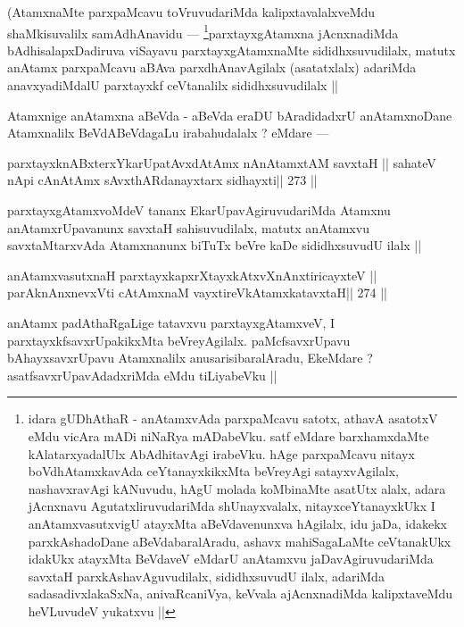 \begin{artha}
(AtamxnaMte parxpaMcavu toVruvudariMda kalipxtavalalxveMdu shaMkisuvalilx samAdhAnavidu --- \footnote[3]{idara gUDhAthaR - anAtamxvAda parxpaMcavu satotx, athavA asatotxV eMdu vicAra mADi niNaRya mADabeVku. satf eMdare barxhamxdaMte kAlatarxyadalUlx AbAdhitavAgi irabeVku. hAge parxpaMcavu nitayx boVdhAtamxkavAda ceYtanayxkikxMta beVreyAgi satayxvAgilalx, nashavxravAgi kANuvudu, hAgU molada koMbinaMte asatUtx alalx, adara jAcnxnavu AgutatxliruvudariMda shUnayxvalalx, nitayxceYtanayxkUkx I anAtamxvasutxvigU atayxMta aBeVdavenunxva hAgilalx, idu jaDa, idakekx parxkAshadoDane aBeVdabaralAradu, ashavx mahiSagaLaMte ceVtanakUkx idakUkx atayxMta BeVdaveV eMdarU anAtamxvu jaDavAgiruvudariMda savxtaH parxkAshavAguvudilalx, sididhxsuvudU ilalx, adariMda sadasadivxlakaSxNa, anivaRcaniVya, keVvala ajAcnxnadiMda kalipxtaveMdu heVLuvudeV yukatxvu ||}parxtayxgAtamxna jAcnxnadiMda bAdhisalapxDadiruva viSayavu parxtayxgAtamxnaMte sididhxsuvudilalx, matutx anAtamx parxpaMcavu aBAva parxdhAnavAgilalx (asatatxlalx) adariMda anavxyadiMdalU parxtayxkf ceVtanalilx sididhxsuvudilalx ||
\end{artha}

\begin{artha}
Atamxnige anAtamxna aBeVda - aBeVda eraDU bAradidadxrU anAtamxnoDane Atamxnalilx BeVdABeVdagaLu irabahudalalx ? eMdare ---
\end{artha}

\begin{shl}
parxtayxknABxterxYkarUpatAvxdAtAmx nAnAtamxtAM savxtaH ||
sahateV nApi cAnAtAmx sAvxthARdanayxtarx sidhayxti\hfill || 273 ||
\end{shl}

\begin{artha}
parxtayxgAtamxvoMdeV tananx EkarUpavAgiruvudariMda Atamxnu anAtamxrUpavanunx savxtaH sahisuvudilalx, matutx anAtamxvu savxtaMtarxvAda Atamxnanunx biTuTx beVre kaDe sididhxsuvudU ilalx ||
\end{artha}

\begin{shl}
anAtamxvasutxnaH parxtayxkapxrXtayxkAtxvXnAnxtiricayxteV ||
parAknAnxnevxVti cA\s\s tAmxnaM vayxtireVkAtamxkatavxtaH\hfill || 274 ||
\end{shl}

\begin{artha}
anAtamx padAthaRgaLige tatavxvu parxtayxgAtamxveV, I parxtayxkfsavxrUpakikxMta beVreyAgilalx. paMcfsavxrUpavu bAhayxsavxrUpavu Atamxnalilx anusarisibaralAradu, EkeMdare ? asatfsavxrUpavAdadxriMda eMdu tiLiyabeVku ||
\end{artha}

